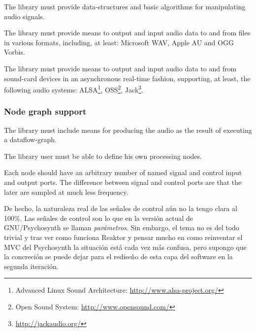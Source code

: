 \begin{requirement}
  \label{req:iter1-begin}
  The library must provide data-structures and basic algorithms for
  manipulating audio signals.
\end{requirement}

\begin{requirement}
  The library must provide means to output and input audio data to and
  from files in various formats, including, at least: Microsoft WAV,
  Apple AU and OGG Vorbis.
\end{requirement}

\begin{requirement}
  \label{req:soundsys}
  \label{req:iter1-end}
  The library must provide means to output and input audio data to and
  from sound-card devices in an asynchronous real-time fashion,
  supporting, at least, the following audio systems:
  ALSA\footnote{Advanced Linux Sound Architecture:
    \url{http://www.alsa-project.org/}}, OSS\footnote{Open Sound
    System: \url{http://www.opensound.com/}}, Jack\footnote{\url{http://jackaudio.org/}}.
\end{requirement}

\subsubsection{Node graph support}

\begin{requirement}
  \label{req:iter2-begin}
  The library must include means for producing the audio as the result of
  executing a dataflow-graph. 
\end{requirement}

\begin{requirement}
  The library user must be able to define his own processing nodes.
\end{requirement}

\begin{requirement}
  \label{req:porttype}
  Each node should have an arbitrary number of named signal and
  control input and output ports. The difference between signal and
  control ports are that the later are sampled at much less frequency.
\end{requirement}

\begin{todo}
De hecho, la naturaleza real de las señales de control aún no la tengo
clara al 100\%. Las señales de control son lo que en la versión actual
de GNU/Psychosynth se llaman \emph{parámetros}. Sin embargo, el tema
no es del todo trivial y tras ver como funciona Reaktor y pensar mucho
en como reinventar el MVC del Psychosynth la situación está cada vez
más confusa, pero supongo que la concreción se puede dejar para el
rediseño de esta capa del software en la segunda iteración.
\end{todo}

